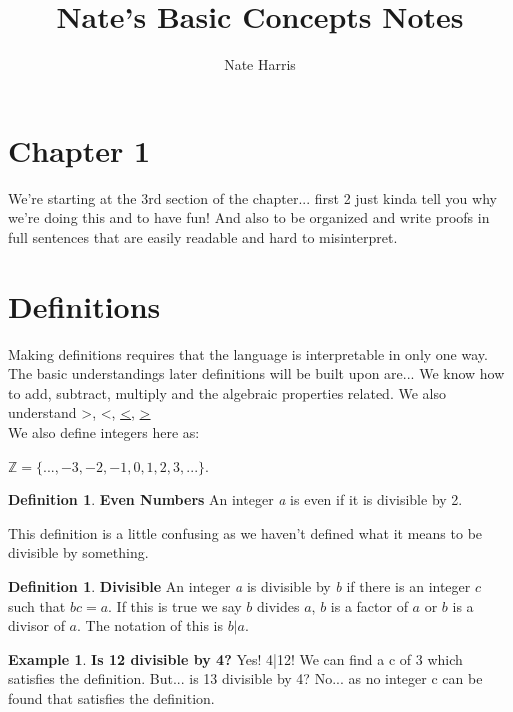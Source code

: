 \documentclass{article}
\title{Nate's Basic Concepts Notes}
\author{Nate Harris}
\theoremstyle{definition}
\theoremstyle{definition}
\newtheorem{dfn}[thm]{Definition}
\newtheorem{exmp}[thm]{Example}
\begin{document}
\maketitle{}
\newpage
\tableofcontents{}
\newpage

\section*{Chapter 1}

We're starting at the 3rd section of the chapter... first 2 just kinda tell you
why we're doing this and to have fun! And also to be organized and write proofs in
full sentences that are easily readable and hard to misinterpret.
\setcounter{section}{3}
\section*{Definitions}

Making definitions requires that the language is interpretable in only one way.
The basic understandings later definitions will be built upon are... 
We know how to add, subtract, multiply and the algebraic properties related.
We also understand \textgreater, \textless, \underline{\textless}, \underline{\textgreater}
\\[\baselineskip]
\noindent We also define integers here as:
\begin{center}
    $\mathbb{Z} = \{..., -3, -2, -1, 0, 1, 2, 3, ...\}$.
\end{center}
\begin{dfn} \textbf{Even Numbers}
    An integer \textit{a} is even if it is divisible by 2.
\end{dfn}

This definition is a little confusing as we haven't defined what it means to 
be divisible by something.

\begin{dfn} \textbf{Divisible}
An integer \textit{a} is divisible by \textit{b} if there is an integer $c$
    such that $bc = a$. If this is true we say $b$ divides $a$, $b$ is a factor of
    $a$ or $b$ is a divisor of $a$. The notation of this is $b|a$.
\end{dfn}

\begin{exmp} \textbf{Is 12 divisible by 4?}
    Yes! 4|12! We can find a c of 3 which satisfies the definition. But... is 13 divisible
    by 4? No... as no integer c can be found that satisfies the definition.
\end{exmp}
\end{document}
